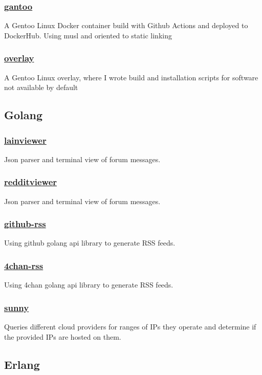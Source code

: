 \documentclass[11pt]{article}
\begin{document}
\subsubsection{\href {https://github.com/azimut/gantoo} {gantoo}}
A Gentoo Linux Docker container build with Github Actions and deployed to DockerHub. Using musl and oriented to static linking
\subsubsection{\href {https://github.com/azimut/overlay} {overlay}}
A Gentoo Linux overlay, where I wrote build and installation scripts for software not available by default

\subsection{Golang}
\subsubsection{\href {https://github.com/azimut/lainviewer} {lainviewer}}
Json parser and terminal view of forum messages.
\subsubsection{\href {https://github.com/azimut/redditviewer} {redditviewer}}
Json parser and terminal view of forum messages.
\subsubsection{\href {https://github.com/azimut/github-rss} {github-rss}}
Using github golang api library to generate RSS feeds.
\subsubsection{\href {https://github.com/azimut/4chan-rss} {4chan-rss}}
Using 4chan golang api library to generate RSS feeds.
\subsubsection{\href {https://github.com/azimut/sunny} {sunny}}
Queries different cloud providers for ranges of IPs they operate and determine if the provided IPs are hosted on them.

\subsection{Erlang}
\end{document}
